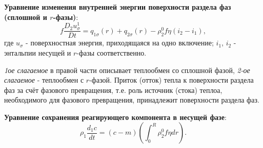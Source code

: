 \documentclass[12pt, a4paper]{report}
\begin{document}
	\textbf{Уравнение изменения внутренней энергии поверхности раздела фаз (сплошной и $r$-фазы)}:
	\begin{equation*}
		f \frac{D_{2} u_{\sigma}^{1}}{Dt} = q_{1 \sigma}(r) + q_{2 \sigma}(r) - \rho_{2}^{0} f \eta (i_{2} - i_{1}),
	\end{equation*}
	где $u_{\sigma}$ - поверхностная энергия, приходящаяся на одно включение; $i_{1}$, $i_{2}$ - энтальпии несущей и $r$-фазы соответственно. \par
	\textit{1ое слагаемое} в правой части описывает теплообмен со сплошной фазой, \textit{2-ое слагаемое} - теплообмен с $r$-фазой. Приток (отток) тепла к поверхности раздела фаз за счёт фазового превращения, т.е. роль источник (стока) теплоа, необходимого для фазового превращения, принадлежит поверхности раздела фаз. \par
	\textbf{Уравнение сохранения реагирующего компонента в несущей фазе}:
	\begin{equation*}
		\rho_{1} \frac{d_{1} c}{dt} = (c - m)(\int_{0}^{R} \rho_{2}^{0} f \eta dr).
	\end{equation*}
\end{document}

